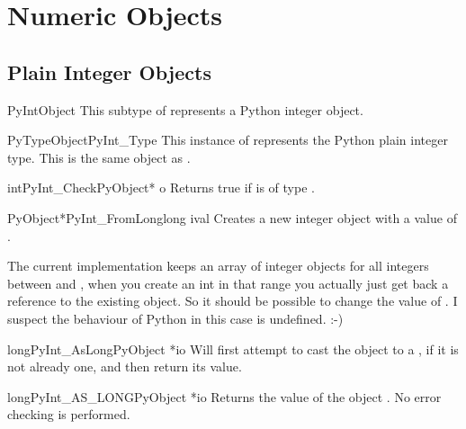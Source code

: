 \documentclass{manual}
\begin{document}
\section{Numeric Objects \label{numericObjects}}



\subsection{Plain Integer Objects \label{intObjects}}

\begin{ctypedesc}{PyIntObject}
This subtype of  represents a Python integer object.
\end{ctypedesc}

\begin{cvardesc}{PyTypeObject}{PyInt_Type}
This instance of  represents the Python plain 
integer type.  This is the same object as .
\end{cvardesc}

\begin{cfuncdesc}{int}{PyInt_Check}{PyObject* o}
Returns true if  is of type .
\end{cfuncdesc}

\begin{cfuncdesc}{PyObject*}{PyInt_FromLong}{long ival}
Creates a new integer object with a value of .

The current implementation keeps an array of integer objects for all
integers between  and , when you create an int in
that range you actually just get back a reference to the existing
object. So it should be possible to change the value of . I
suspect the behaviour of Python in this case is undefined. :-)
\end{cfuncdesc}

\begin{cfuncdesc}{long}{PyInt_AsLong}{PyObject *io}
Will first attempt to cast the object to a , if
it is not already one, and then return its value.
\end{cfuncdesc}

\begin{cfuncdesc}{long}{PyInt_AS_LONG}{PyObject *io}
Returns the value of the object .  No error checking is
performed.
\end{cfuncdesc}
\end{document}
